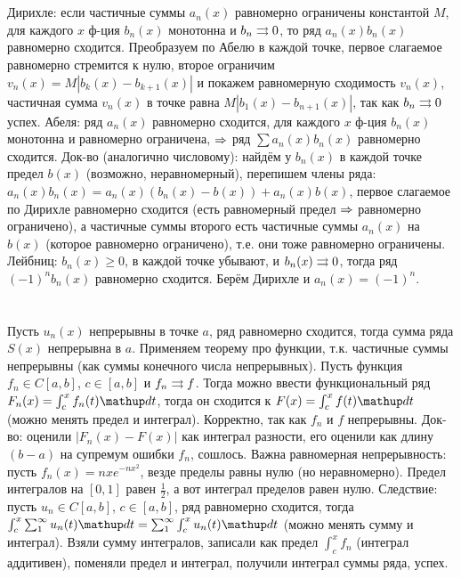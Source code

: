 \section{} %
Дирихле: если частичные суммы $a_n(x)$ равномерно ограничены константой $M$, для каждого $x$ ф-ция $b_n(x)$ монотонна и $b_n \rightrightarrows 0$, то ряд $a_n(x)b_n(x)$ равномерно сходится.
Преобразуем по Абелю в каждой точке, первое слагаемое равномерно стремится к нулю, второе ограничим $v_n(x)=M|b_k(x)-b_{k+1}(x)|$ и покажем равномерную сходимость $v_n(x)$,
частичная сумма $v_n(x)$ в точке равна $M|b_1(x)-b_{n+1}(x)|$, так как $b_n \rightrightarrows 0$ успех.
Абеля: ряд $a_n(x)$ равномерно сходится, для каждого $x$ ф-ция $b_n(x)$ монотонна и равномерно ограничена, $\Rightarrow$ ряд $\sum a_n(x)b_n(x)$ равномерно сходится.
Док-во (аналогично числовому): найдём у $b_n(x)$ в каждой точке предел $b(x)$ (возможно, неравномерный), перепишем члены ряда: $a_n(x)b_n(x) = a_n(x)(b_n(x)-b(x)) + a_n(x)b(x)$,
первое слагаемое по Дирихле равномерно сходится (есть равномерный предел $\Rightarrow$ равномерно ограничено), а частичные суммы второго есть частичные суммы $a_n(x)$ на $b(x)$ (которое равномерно ограничено),
т.е. они тоже равномерно ограничены.
Лейбниц: $b_n(x) \ge 0$, в каждой точке убывают, и $b_n(x) \rightrightarrows 0$, тогда ряд $(-1)^nb_n(x)$ равномерно сходится.
Берём Дирихле и $a_n(x)=(-1)^n$.

\section{} %
Пусть $u_n(x)$ непрерывны в точке $a$, ряд равномерно сходится, тогда сумма ряда $S(x)$ непрерывна в $a$.
Применяем теорему про функции, т.к. частичные суммы непрерывны (как суммы конечного числа непрерывных).
Пусть функция $f_n \in C[a, b]$, $c \in [a,b]$ и $f_n \rightrightarrows f$.
Тогда можно ввести функциональный ряд $F_n(x)=\int_c^x f_n(t) \d t$, тогда он сходится к $F(x)=\int_c^x f(t)\d t$ (можно менять предел и интеграл).
Корректно, так как $f_n$ и $f$ непрерывны.
Док-во: оценили $|F_n(x)-F(x)|$ как интеграл разности, его оценили как длину $(b-a)$ на супремум ошибки $f_n$, сошлось.
Важна равномерная непрерывность: пусть $f_n(x)=nxe^{-nx^2}$, везде пределы равны нулю (но неравномерно).
Предел интегралов на $[0,1]$ равен $\frac 1 2$, а вот интеграл пределов равен нулю.
Следствие: пусть $u_n \in C[a, b]$, $c \in [a,b]$, ряд равномерно сходится, тогда $\int_c^x \sum_1^\infty u_n(t) \d t = \sum_1^\infty \int_c^x u_n(t) \d t$ (можно менять сумму и интеграл).
Взяли сумму интегралов, записали как предел $\int_c^x f_n$ (интеграл аддитивен), поменяли предел и интеграл, получили интеграл суммы ряда, успех.

